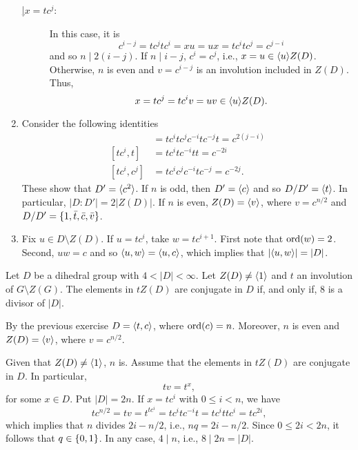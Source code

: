 \begin{solution}
\begin{solution}
\begin{enumerate}[\rm a)]
\begin{description}
    \item[\rm\underline{\vphantom|$x=tc^j$}:] In this case, it is
    $$
        c^{i-j}= tc^jtc^i = xu=ux=tc^itc^j = c^{j-i}
    $$
    and so $n\mid2(i-j)$. If $n\mid i-j$, $c^i=c^j$, i.e., $x=u\in\langle u\rangle Z(D)$. Otherwise, $n$ is even and $v=c^{i-j}$ is an involution included in $Z(D)$. Thus,
    $$
        x=tc^j=tc^iv=uv\in\langle u\rangle Z(D).
    $$
    \end{description}

    \item Consider the following identities
    \begin{align*}
        [tc^i,tc^j] &= tc^itc^jc^{-i}tc^{-j}t = c^{2(j-i)}\\
        [tc^i,t] &= tc^itc^{-i}tt = c^{-2i}\\
        [tc^i,c^j] &= tc^ic^jc^{-i}tc^{-j} = c^{-2j}.
    \end{align*}
    These show that $D'=\langle c^2\rangle$. If $n$ is odd, then $D'=\langle c\rangle$ and so $D/D'=\langle t\rangle$. In particular, $|D:D'|=2|Z(D)|$. If $n$ is even, $Z(D)=\langle v\rangle$, where $v=c^{n/2}$ and $D/D'=\{1,\bar t,\bar c, \bar v\}$.

    \item Fix $u\in D\setminus Z(D)$. If $u=tc^i$, take $w=tc^{i+1}$. First note that ${\rm ord}(w)=2$. Second, $uw=c$ and so $\langle u,w\rangle=\langle u,c\rangle$, which implies that $|\langle u,w\rangle|=|D|$.
\end{enumerate}
\end{solution}

\begin{exr} Let\/ $D$ be a dihedral group with\/ $4<|D|<\infty$. 
    Let\/ $Z(D)\ne\langle1\rangle$ and\/ $t$ an involution of\/ $G \setminus Z(G)$. The elements in\/ $tZ(D)$ are conjugate in\/ $D$ if, and only if, $8$ is a divisor of\/ $|D|$.
\end{exr}

\begin{solution} By the previous exercise $D=\langle t,c\rangle$, where ${\rm ord}(c)=n$. Moreover, $n$ is even and $Z(D)=\langle v\rangle$, where $v=c^{n/2}$.

Given that $Z(D)\ne\langle1\rangle$, $n$ is. Assume that the elements in $tZ(D)$ are conjugate in $D$. In particular,
$$
    tv=t^x,
$$
for some $x\in D$. Put $|D|=2n$. If $x=tc^i$ with $0\le i<n$, we have
$$
    tc^{n/2} = tv = t^{tc^i} = tc^itc^{-i}t = tc^ittc^i = tc^{2i},
$$
which implies that $n$ divides $2i-n/2$, i.e., $nq=2i-n/2$. Since $0\le2i<2n$, it follows that $q\in\{0,1\}$. In any case, $4\mid n$, i.e., $8\mid2n=|D|$.


\end{solution}
\end{solution}
